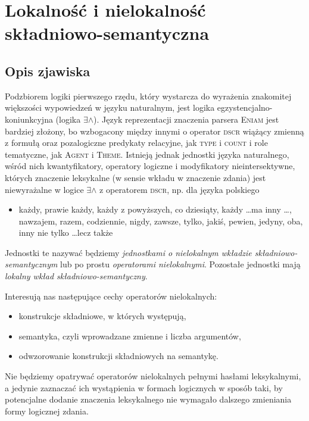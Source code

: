 \documentclass[a4paper, 12pt]{article}
\theoremstyle{remark}
\newcommand{\eniam}{\textsc{Eniam}}
\newcommand{\agent}{\textsc{Agent}}
\newcommand{\theme}{\textsc{Theme}}
\begin{document}
{
\section{Lokalność i nielokalność składniowo-semantyczna}
\renewcommand\thesection{}
\renewcommand\thesubsection{}
\setcounter{subsection}{-1}
\subsection{Opis zjawiska} %
\label{sub:definicja_robocza1}
}

Podzbiorem logiki pierwszego rzędu, który wystarcza do wyrażenia znakomitej większości wypowiedzeń w języku naturalnym, jest logika egzystencjalno-koniunkcyjna (logika $\exists\wedge$). Język reprezentacji znaczenia parsera \eniam{} jest bardziej złożony, bo wzbogacony między innymi o operator \textsc{dscr} wiążący zmienną z formułą oraz pozalogiczne predykaty relacyjne, jak \textsc{type} i \textsc{count} i role tematyczne, jak \agent{} i \theme{}. Istnieją jednak jednostki języka naturalnego, wśród nich kwantyfikatory, operatory logiczne i modyfikatory nieintersektywne, których znaczenie leksykalne (w sensie wkładu w znaczenie zdania) jest niewyrażalne w logice $\exists\wedge$ z operatorem \textsc{dscr}, np. dla języka polskiego
\begin{itemize}
	\item każdy, prawie każdy, każdy z powyższych, co dziesiąty, 
każdy \dots ma inny \dots, nawzajem, razem,
codziennie, nigdy, zawsze, tylko, jakiś, pewien, jedyny, oba, inny
nie tylko \dots lecz także
\end{itemize}
Jednostki te nazywać będziemy \emph{jednostkami o nielokalnym wkładzie składniowo-semantycznym} lub po prostu \emph{operatorami nielokalnymi}. Pozostałe jednostki mają \emph{lokalny wkład składniowo-semantyczny}.

Interesują nas następujące cechy operatorów nielokalnych:
\begin{itemize}
\item konstrukcje składniowe, w których występują,
\item semantyka, czyli wprowadzane zmienne i liczba argumentów, 
\item odwzorowanie konstrukcji składniowych na semantykę.
\end{itemize}
Nie będziemy opatrywać operatorów nielokalnych pełnymi hasłami leksykalnymi, a jedynie zaznaczać ich wystąpienia w formach logicznych
w sposób taki, by potencjalne dodanie znaczenia leksykalnego nie wymagało dalszego zmieniania formy logicznej zdania.
\end{document}
